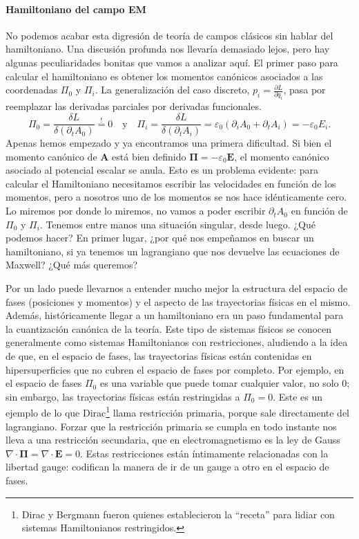\paragraph{Hamiltoniano del campo EM} No podemos acabar esta digresión de teoría de campos clásicos sin hablar del hamiltoniano. Una discusión profunda nos llevaría demasiado lejos, pero hay algunas peculiaridades bonitas que vamos a analizar aquí. El primer paso para calcular el hamiltoniano es obtener los momentos canónicos asociados a las coordenadas \(\Pi_0\) y \(\Pi_i\). La generalización del caso discreto, \(p_i = \frac{\partial L}{\partial \dot{q}_i}\), pasa por reemplazar las derivadas parciales por derivadas funcionales.
\begin{equation}
    \Pi_0 = \frac{\delta L}{\delta (\partial_t A_0)} \overset{!}{=} 0\quad\text{y}\quad \Pi_i = \frac{\delta L}{\delta (\partial_t A_i)} = \varepsilon_0(\partial_i A_0 + \partial_t A_i) = -\varepsilon_0 E_i.
\end{equation}
Apenas hemos empezado y ya encontramos una primera dificultad. Si bien el momento canónico de \(\mathbf{A}\) está bien definido \(\boldsymbol{\Pi} = - \varepsilon_0\mathbf{E}\), el momento canónico asociado al potencial escalar se anula. Esto es un problema evidente: para calcular el Hamiltoniano necesitamos escribir las velocidades en función de los momentos, pero a nosotros uno de los momentos se nos hace idénticamente cero. Lo miremos por donde lo miremos, no vamos a poder escribir \(\partial_t A_0\) en función de \(\Pi_0\) y \(\Pi_i\). Tenemos entre manos una situación singular, desde luego. ¿Qué podemos hacer? En primer lugar, ¿por qué nos empeñamos en buscar un hamiltoniano, si ya tenemos un lagrangiano que nos devuelve las ecuaciones de Maxwell? ¿Qué más queremos?

Por un lado puede llevarnos a entender mucho mejor la estructura del espacio de fases (posiciones y momentos) y el aspecto de las trayectorias físicas en el mismo. Además, históricamente llegar a un hamiltoniano era un paso fundamental para la cuantización canónica de la teoría. Este tipo de sistemas físicos se conocen generalmente como sistemas Hamiltonianos con restricciones, aludiendo a la idea de que, en el espacio de fases, las trayectorias físicas están contenidas en hipersuperficies que no cubren el espacio de fases por completo. Por ejemplo, en el espacio de fases \(\Pi_0\) es una variable que puede tomar cualquier valor, no solo 0; sin embargo, las trayectorias físicas están restringidas a \(\Pi_0 = 0\). Este es un ejemplo de lo que Dirac\footnote{Dirac y Bergmann fueron quienes establecieron la ``receta'' para lidiar con sistemas Hamiltonianos restringidos.} llama restricción primaria, porque sale directamente del lagrangiano. Forzar que la restricción primaria se cumpla en todo instante nos lleva a una restricción secundaria, que en electromagnetismo es la ley de Gauss \(\nabla\cdot\boldsymbol{\Pi} = \nabla\cdot\mathbf{E} = 0\). Estas restricciones están íntimamente relacionadas con la libertad gauge: codifican la manera de ir de un gauge a otro en el espacio de fases.

